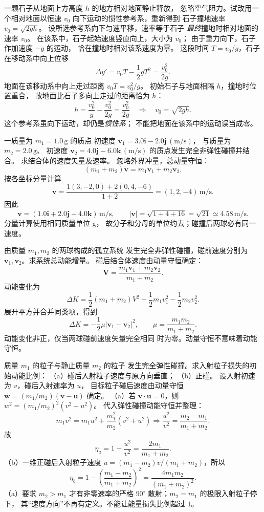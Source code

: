 一颗石子从地面上方高度 $h$ 的地方相对地面静止释放，
忽略空气阻力。试改用一个相对地面以恒速
$v_0$ 向下运动的惯性参考系，重新得到
石子撞地速率 $v_0=\sqrt{2gh}$。
\exsolution
设所选参考系向下匀速平移，速率等于石子
\emph{最终}撞地时相对地面的速率 $v_0$。
在该系中，石子起始速度竖直向上，大小为 $v_0$；
由于重力向下，石子作加速度 $-g$ 的运动，
恰在撞地时相对该系速度为零。
这段时间 $T=v_0/g$，石子在移动系中向上位移
\[
\Delta y' =v_0T-\frac12gT^2=\frac{v_0^2}{2g}.
\]
地面在该移动系中向上走过距离
$v_0T=v_0^2/g$。
初始石子与地面相隔 $h$，撞地时位置重合，
故地面比石子多向上走过的距离恰为 $h$：
\[
h=\frac{v_0^2}{g}-\frac{v_0^2}{2g}
=\frac{v_0^2}{2g}
\quad\Longrightarrow\quad
\boxed{v_0=\sqrt{2gh}}.
\]
\excheck 这个参考系虽向下运动，却仍是\emph{惯性系}；
不能把地面在该系中的运动误当成零。

一质量为 $m_1=1.0\,\mathrm g$ 的质点
初速度 $\bm v_1=3.0\bm i-2.0\bm j\,(\mathrm{m/s})$，
与质量为 $m_2=2.0\,\mathrm g$、
初速度 $\bm v_2=4.0\bm j-6.0\bm k\,(\mathrm{m/s})$
的质点发生完全非弹性碰撞并结合。
求结合体的速度矢量及速率。
\exsolution
忽略外界冲量，总动量守恒：
\[
(m_1+m_2)\bm v=m_1\bm v_1+m_2\bm v_2.
\]
按各坐标分量计算
\[
\bm v=
\frac{1(3,-2,0)+2(0,4,-6)}{1+2}
=(1,2,-4)\,\mathrm{m/s}.
\]
因此
\[
\boxed{\bm v=(1.0\bm i+2.0\bm j-4.0\bm k)\,\mathrm{m/s}},
\qquad
\boxed{|\bm v|=\sqrt{1+4+16}=\sqrt{21}
\simeq4.58\,\mathrm{m/s}}.
\]
\excheck 分量计算使用相同质量单位 g，
故分子和分母的单位约去；碰撞后两球必有同一速度。

由质量 $m_1,m_2$ 的两球构成的孤立系统
发生完全非弹性碰撞，碰前速度分别为
$\bm v_1,\bm v_2$。求系统总动能增量。
\exsolution
碰后结合体速度由动量守恒确定：
\[
\bm V=\frac{m_1\bm v_1+m_2\bm v_2}{m_1+m_2}.
\]
动能变化为
\[
\Delta K=\frac12(m_1+m_2)V^2-
\frac12m_1v_1^2-\frac12m_2v_2^2.
\]
展开平方并合并同类项，得到
\[
\boxed{\Delta K=
-\frac12\mu|\bm v_1-\bm v_2|^2},
\qquad
\mu=\frac{m_1m_2}{m_1+m_2}.
\]
\excheck 动能变化非正，仅当两球碰前速度矢量完全相同
时为零。动量守恒不意味着动能守恒。

质量 $m_1$ 的粒子与静止质量 $m_2$ 的粒子
发生完全弹性碰撞。求入射粒子损失的初始动能比例：
（a）碰后入射粒子速度与原方向垂直；
（b）正碰。
\exsolution
设入射初速为 $v$，碰后入射速率为 $u$，
目标粒子碰后速度由动量守恒
$\bm w=(m_1/m_2)(\bm v-\bm u)$ 确定。
（a）若 $\bm v\cdot\bm u=0$，则
$w^2=(m_1/m_2)^2(v^2+u^2)$。
代入弹性碰撞动能守恒并整理：
\[
m_1v^2=m_1u^2+
\frac{m_1^2}{m_2}(v^2+u^2)
\Longrightarrow
\frac{u^2}{v^2}=\frac{m_2-m_1}{m_1+m_2}.
\]
故
\[
\boxed{\eta_a=1-\frac{u^2}{v^2}
=\frac{2m_1}{m_1+m_2}}.
\]
（b）一维正碰后入射粒子速度
$u=(m_1-m_2)v/(m_1+m_2)$，所以
\[
\boxed{\eta_b=
1-\left(\frac{m_1-m_2}{m_1+m_2}\right)^2
=\frac{4m_1m_2}{(m_1+m_2)^2}}.
\]
\excheck （a）要求 $m_2>m_1$ 才有非零速率的严格
$90^\circ$ 散射；$m_2=m_1$ 的极限入射粒子停下，
其“速度方向”不再有定义。不能让能量损失比例超过 $1$。

